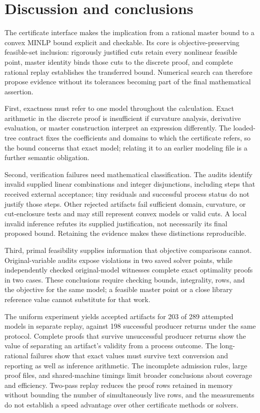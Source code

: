 \section{Discussion and conclusions}
\label{sec:discussion}
The certificate interface makes the implication from a rational master bound to a convex MINLP bound explicit and checkable. Its core is objective-preserving feasible-set inclusion: rigorously justified cuts retain every nonlinear feasible point, master identity binds those cuts to the discrete proof, and complete rational replay establishes the transferred bound. Numerical search can therefore propose evidence without its tolerances becoming part of the final mathematical assertion.

First, exactness must refer to one model throughout the calculation. Exact arithmetic in the discrete proof is insufficient if curvature analysis, derivative evaluation, or master construction interpret an expression differently. The loaded-tree contract fixes the coefficients and domains to which the certificate refers, so the bound concerns that exact model; relating it to an earlier modeling file is a further semantic obligation.

Second, verification failures need mathematical classification. The audits identify invalid supplied linear combinations and integer disjunctions, including steps that received external acceptance; tiny residuals and successful process status do not justify those steps. Other rejected artifacts fail sufficient domain, curvature, or cut-enclosure tests and may still represent convex models or valid cuts. A local invalid inference refutes its supplied justification, not necessarily its final proposed bound. Retaining the evidence makes these distinctions reproducible.

Third, primal feasibility supplies information that objective comparisons cannot. Original-variable audits expose violations in two saved solver points, while independently checked original-model witnesses complete exact optimality proofs in two cases. These conclusions require checking bounds, integrality, rows, and the objective for the same model; a feasible master point or a close library reference value cannot substitute for that work.

The uniform experiment yields accepted artifacts for 203 of 289 attempted models in separate replay, against 198 successful producer returns under the same protocol. Complete proofs that survive unsuccessful producer returns show the value of separating an artifact's validity from a process outcome. The long-rational failures show that exact values must survive text conversion and reporting as well as inference arithmetic. The incomplete admission rules, large proof files, and shared-machine timings limit broader conclusions about coverage and efficiency. Two-pass replay reduces the proof rows retained in memory without bounding the number of simultaneously live rows, and the measurements do not establish a speed advantage over other certificate methods or solvers.

